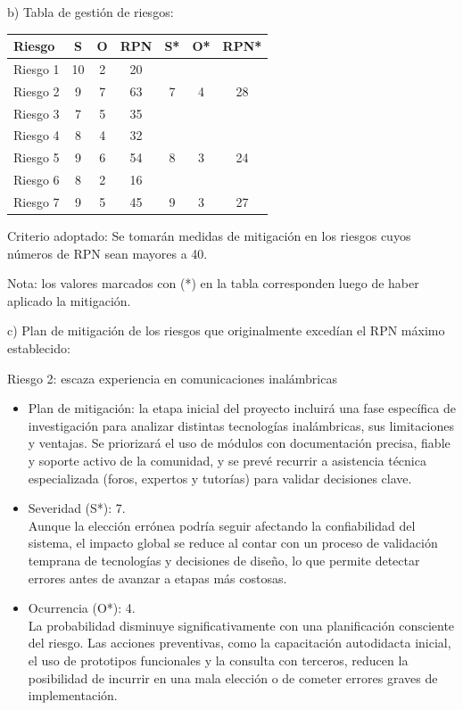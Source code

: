 \documentclass[
11pt, %
]{charter}
\begin{document}
b) Tabla de gestión de riesgos:

\begin{table}[htpb]
\centering
\begin{tabularx}{\linewidth}{@{}|X|c|c|c|c|c|c|@{}}
\hline
\rowcolor[HTML]{C0C0C0} 
Riesgo		& S  & O  & RPN & S* & O* & RPN* \\ \hline
Riesgo 1	& 10 & 2  & 20  &    &    &      \\ \hline
Riesgo 2	& 9  & 7  & 63  & 7  & 4  & 28   \\ \hline
Riesgo 3	& 7  & 5  & 35  &    &    &      \\ \hline
Riesgo 4	& 8  & 4  & 32  &    &    &      \\ \hline
Riesgo 5	& 9  & 6  & 54  & 8  & 3  & 24   \\ \hline
Riesgo 6	& 8  & 2  & 16  &    &    &      \\ \hline
Riesgo 7	& 9  & 5  & 45  & 9  & 3  & 27   \\ \hline
\end{tabularx}%
\end{table}

Criterio adoptado: Se tomarán medidas de mitigación en los riesgos cuyos números de RPN sean mayores a 40.

Nota: los valores marcados con (*) en la tabla corresponden luego de haber aplicado la mitigación.

c) Plan de mitigación de los riesgos que originalmente excedían el RPN máximo establecido:
 
Riesgo 2: escaza experiencia en comunicaciones inalámbricas
  \begin{itemize}
  	\item Plan de mitigación: la etapa inicial del proyecto incluirá una fase específica de investigación para analizar distintas tecnologías inalámbricas, sus limitaciones y ventajas. Se priorizará el uso de módulos con documentación precisa, fiable y soporte activo de la comunidad, y se prevé recurrir a asistencia técnica especializada (foros, expertos y tutorías) para validar decisiones clave.
	\item Severidad (S*): 7. \\ Aunque la elección errónea podría seguir afectando la confiabilidad del sistema, el impacto global se reduce al contar con un proceso de validación temprana de tecnologías y decisiones de diseño, lo que permite detectar errores antes de avanzar a etapas más costosas.
	\item Ocurrencia (O*): 4. \\ La probabilidad disminuye significativamente con una planificación consciente del riesgo. Las acciones preventivas, como la capacitación autodidacta inicial, el uso de prototipos funcionales y la consulta con terceros, reducen la posibilidad de incurrir en una mala elección o de cometer errores graves de implementación.
	\end{itemize}
	
\end{document}

